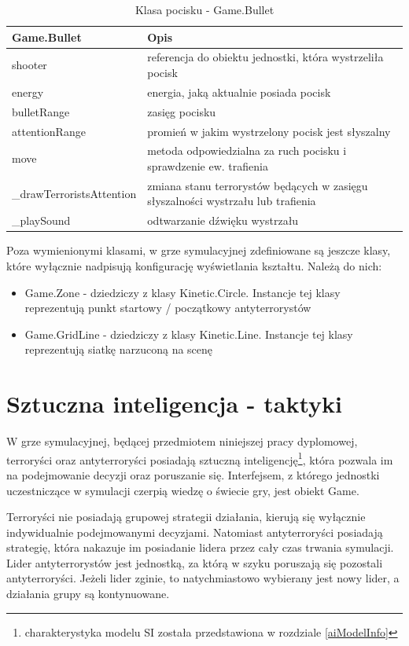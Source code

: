 \begin{table}
\begin{center}
\begin{tabular}{|p{}|p{}|}
\hline
\textbf{Game.Bullet} & Opis\\\hline		
	shooter & referencja do obiektu jednostki,  która wystrzeliła pocisk\\
	energy & energia, jaką aktualnie posiada pocisk\\
	bulletRange & zasięg pocisku\\	
	attentionRange & promień w jakim wystrzelony pocisk jest słyszalny
\\\hline
	move & metoda odpowiedzialna za ruch pocisku i sprawdzenie ew. trafienia\\
	\_drawTerroristsAttention & zmiana stanu terrorystów będących w zasięgu słyszalności wystrzału lub trafienia\\
	\_playSound & odtwarzanie dźwięku wystrzału
\\\hline
\end{tabular}
\caption {Klasa pocisku - Game.Bullet\label{objectsGameBullet}}
\end{center}
\end{table} 
\clearpage
Poza wymienionymi klasami, w grze symulacyjnej zdefiniowane są jeszcze klasy, które wyłącznie nadpisują konfigurację wyświetlania kształtu. Należą do nich:
\begin{itemize}
	\item Game.Zone - dziedziczy z klasy Kinetic.Circle. Instancje tej klasy reprezentują punkt startowy / początkowy antyterrorystów
	\item Game.GridLine - dziedziczy z klasy Kinetic.Line. Instancje tej klasy reprezentują siatkę narzuconą na scenę
\end{itemize}

\section{Sztuczna inteligencja - taktyki}\label{tacticts}
W grze symulacyjnej, będącej przedmiotem niniejszej pracy dyplomowej, terroryści oraz antyterroryści posiadają sztuczną inteligencję\footnote{charakterystyka modelu SI została przedstawiona w rozdziale \ref{aiModelInfo}}, która pozwala im na podejmowanie decyzji oraz poruszanie się. Interfejsem, z którego jednostki uczestniczące w symulacji czerpią wiedzę o świecie gry, jest obiekt Game. 

Terroryści nie posiadają grupowej strategii działania, kierują się wyłącznie indywidualnie podejmowanymi decyzjami. Natomiast antyterroryści posiadają strategię, która nakazuje im posiadanie lidera przez cały czas trwania symulacji. Lider antyterrorystów jest jednostką, za którą w szyku poruszają się pozostali antyterroryści. Jeżeli lider zginie, to natychmiastowo wybierany jest nowy lider, a działania grupy są kontynuowane.
  
